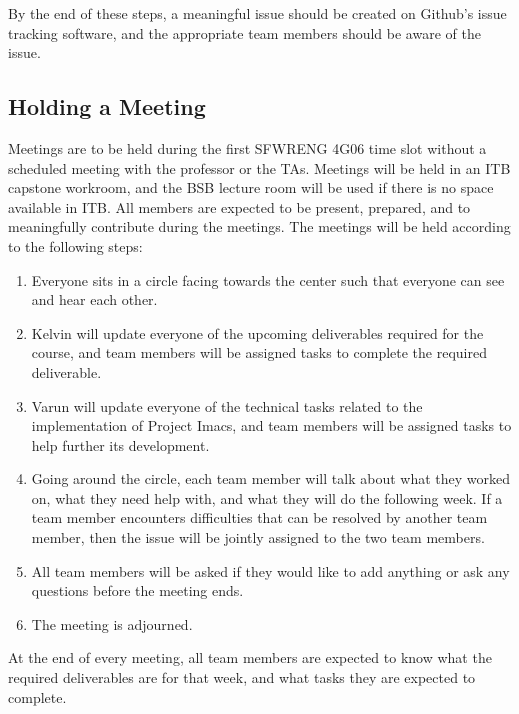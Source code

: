 \documentclass{article}
\begin{document}
By the end of these steps, a meaningful issue should be created on Github's issue tracking software, and the appropriate team members should be aware of the issue.

\subsection{Holding a Meeting}
\label{sec:hold-meeting}
Meetings are to be held during the first SFWRENG 4G06 time slot without a scheduled meeting with the professor or the TAs. Meetings will be held in an ITB capstone workroom, and the BSB lecture room will be used if there is no space available in ITB. All members are expected to be present, prepared, and to meaningfully contribute during the meetings. The meetings will be held according to the following steps:

\begin{enumerate}
\item Everyone sits in a circle facing towards the center such that everyone can see and hear each other.
\item Kelvin will update everyone of the upcoming deliverables required for the course, and team members will be assigned tasks to complete the required deliverable.
\item Varun will update everyone of the technical tasks related to the implementation of Project Imacs, and team members will be assigned tasks to help further its development.
\item Going around the circle, each team member will talk about what they worked on, what they need help with, and what they will do the following week. If a team member encounters difficulties that can be resolved by another team member, then the issue will be jointly assigned to the two team members.
\item All team members will be asked if they would like to add anything or ask any questions before the meeting ends.
\item The meeting is adjourned.  
\end{enumerate}

At the end of every meeting, all team members are expected to know what the required deliverables are for that week, and what tasks they are expected to complete.
\end{document}
